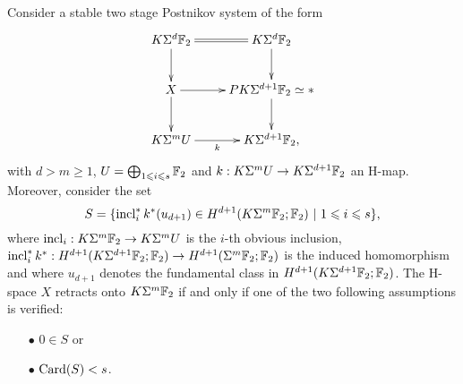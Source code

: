 Consider a stable two stage Postnikov system of the form
$$\xymatrix{
K\Sigma^d\F_2\ar[d]\ar@{=}[r] &K\Sigma^d\F_2\ar[d]\\
X\ar[r]\ar[d] &PK\Sigma^{d+1} \F_2\simeq{*}\ar[d]\\
K\Sigma^mU\ar[r]_-k &K\Sigma^{d+1} \F_2,
}$$ with $d>m\geq1$, $U=\bigoplus_{1\leqslant i\leqslant s}\mathbb{F}_2$ and $k:K\Sigma^m U\to K\Sigma^{d+1}\mathbb{F}_2$ an H-map.
Moreover, consider the set 
$$S=\{\operatorname{incl}_{i}^*k^*(u_{d+1})\in H^{d+1}(K\Sigma^m\mathbb{F}_2;\mathbb{F}_2)\ |\ 1\leqslant i\leqslant s\},$$
where $\operatorname{incl}_i:K\Sigma^m\mathbb{F}_2\to K\Sigma^m U$ is the $i$-th obvious inclusion, $\operatorname{incl}_i^*k^*:H^{d+1}(K\Sigma^{d+1}\mathbb{F}_2;\mathbb{F}_2)\to H^{d+1}(\Sigma^m\mathbb{F}_2;\mathbb{F}_2)$ is the induced homomorphism and where $u_{d+1}$ denotes the fundamental class in $H^{d+1}(K\Sigma^{d+1}\mathbb{F}_2;\mathbb{F}_2)$.
The H-space $X$ retracts onto $K\Sigma^m \mathbb{F}_2$ if and only if one of the two following assumptions is verified:
\begin{itemize}
\item[$\bullet$]{$0\in S$ or}
\item[$\bullet$]{$\operatorname{Card}(S)<s$.}
\end{itemize}
\endinput